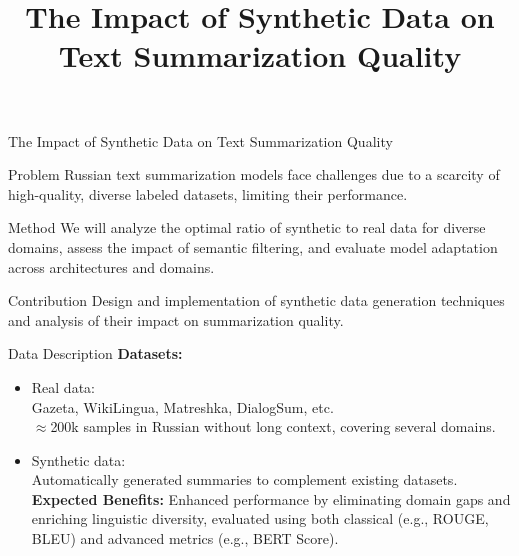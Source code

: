 \documentclass[12pt,pdf,hyperref={unicode}]{beamer}
\title{The Impact of Synthetic Data on Text Summarization Quality}
\begin{document}
\begin{frame}{The Impact of Synthetic Data on Text Summarization Quality}
    \begin{block}{Problem}
        Russian text summarization models face challenges due to a scarcity of high-quality, diverse labeled datasets, limiting their performance.
    \end{block}
    \vfill
    \begin{block}{Method}
        We will analyze the optimal ratio of synthetic to real data for diverse domains, assess the impact of semantic filtering, and evaluate model adaptation across architectures and domains.    \end{block}
    \vfill
    \begin{block}{Contribution}
        Design and implementation of synthetic data generation techniques and analysis of their impact on summarization quality.
    \end{block}
\end{frame}

\begin{frame}{Data Description}
    \textbf{Datasets:}
    \begin{itemize}
        \item Real data: \\ Gazeta, WikiLingua, Matreshka, DialogSum, etc. \\ $\approx$200k samples in Russian without long context, covering several domains.
        \item Synthetic data: \\ Automatically generated summaries to complement existing datasets. \\ \textbf{Expected Benefits:} Enhanced performance by eliminating domain gaps and enriching linguistic diversity, evaluated using both classical (e.g., ROUGE, BLEU) and advanced metrics (e.g., BERT Score).
    \end{itemize}
\end{frame}
\end{document}
